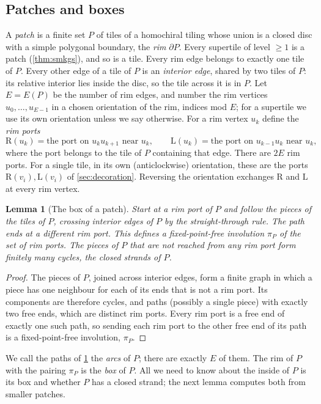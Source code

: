 \documentclass[11pt]{amsart}
\newtheorem{lemma}[theorem]{Lemma}
\theoremstyle{definition}
\theoremstyle{remark}
\newcommand{\Lp}{\mathrm L}
\newcommand{\Rp}{\mathrm R}
\newcommand{\rim}{\partial}
\begin{document}
\subsection{Patches and boxes}
A \emph{patch} is a finite set $P$ of tiles of a homochiral tiling whose union is a closed disc with a simple polygonal
boundary, the \emph{rim} $\rim P$. Every supertile of level $\ge1$ is a patch (\cref{thm:smkgs}), and so is a tile.
Every rim edge belongs to exactly one tile of $P$. Every other edge of a tile of $P$ is an \emph{interior edge}, shared
by two tiles of $P$: its relative interior lies inside the disc, so the tile across it is in $P$. Let $E=E(P)$ be the number of rim edges, and number the rim vertices $u_0,\dots,u_{E-1}$ in a
chosen orientation of the rim, indices mod $E$; for a supertile we use its own orientation unless we say otherwise.
For a rim vertex $u_k$ define the \emph{rim ports}
\[
\Rp(u_k)=\text{the port on } u_ku_{k+1} \text{ near } u_k,\qquad \Lp(u_k)=\text{the port on } u_{k-1}u_k \text{ near } u_k,
\]
where the port belongs to the tile of $P$ containing that edge. There are $2E$ rim ports. For a single tile, in its own
(anticlockwise) orientation, these are the ports $\Rp(v_i),\Lp(v_i)$ of \cref{sec:decoration}. Reversing the
orientation exchanges $\Rp$ and $\Lp$ at every rim vertex.

\begin{lemma}[The box of a patch]\label{lem:box}
Start at a rim port of $P$ and follow the pieces of the tiles of $P$, crossing interior edges of $P$ by the
straight-through rule. The path ends at a different rim port. This defines a fixed-point-free involution $\pi_P$ of the
set of rim ports. The pieces of $P$ that are not reached from any rim port form finitely many cycles, the
\emph{closed strands of $P$}.
\end{lemma}

\begin{proof}
The pieces of $P$, joined across interior edges, form a finite graph in which a piece has one neighbour for each of its
ends that is not a rim port. Its components are therefore cycles, and paths (possibly a single piece) with exactly two
free ends, which are distinct rim ports. Every rim port is a free end of exactly one such path, so sending each rim
port to the other free end of its path is a fixed-point-free involution, $\pi_P$.
\end{proof}

We call the paths of \cref{lem:box} the \emph{arcs} of $P$; there are exactly $E$ of them. The rim of $P$ with the
pairing $\pi_P$ is the \emph{box} of $P$. All we need to know about the inside of $P$ is its box and whether $P$ has a
closed strand; the next lemma computes both from smaller patches.
\end{document}
